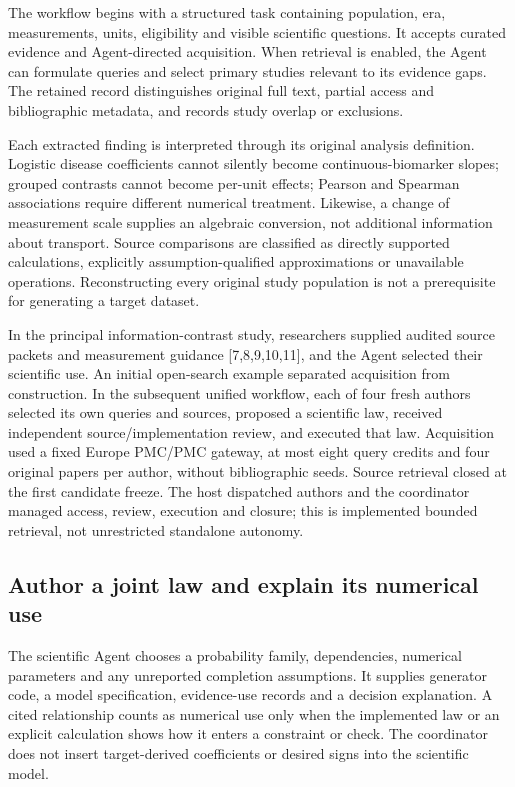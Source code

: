 \documentclass[10pt,twocolumn]{article}
\begin{document}
The workflow begins with a structured task containing population, era, measurements, units, eligibility and visible scientific questions. It accepts curated evidence and Agent-directed acquisition. When retrieval is enabled, the Agent can formulate queries and select primary studies relevant to its evidence gaps. The retained record distinguishes original full text, partial access and bibliographic metadata, and records study overlap or exclusions.


Each extracted finding is interpreted through its original analysis definition. Logistic disease coefficients cannot silently become continuous-biomarker slopes; grouped contrasts cannot become per-unit effects; Pearson and Spearman associations require different numerical treatment. Likewise, a change of measurement scale supplies an algebraic conversion, not additional information about transport. Source comparisons are classified as directly supported calculations, explicitly assumption-qualified approximations or unavailable operations. Reconstructing every original study population is not a prerequisite for generating a target dataset.


In the principal information-contrast study, researchers supplied audited source packets and measurement guidance [7,8,9,10,11], and the Agent selected their scientific use. An initial open-search example separated acquisition from construction. In the subsequent unified workflow, each of four fresh authors selected its own queries and sources, proposed a scientific law, received independent source/implementation review, and executed that law. Acquisition used a fixed Europe PMC/PMC gateway, at most eight query credits and four original papers per author, without bibliographic seeds. Source retrieval closed at the first candidate freeze. The host dispatched authors and the coordinator managed access, review, execution and closure; this is implemented bounded retrieval, not unrestricted standalone autonomy.


\subsection{Author a joint law and explain its numerical use}

The scientific Agent chooses a probability family, dependencies, numerical parameters and any unreported completion assumptions. It supplies generator code, a model specification, evidence-use records and a decision explanation. A cited relationship counts as numerical use only when the implemented law or an explicit calculation shows how it enters a constraint or check. The coordinator does not insert target-derived coefficients or desired signs into the scientific model.
\end{document}
